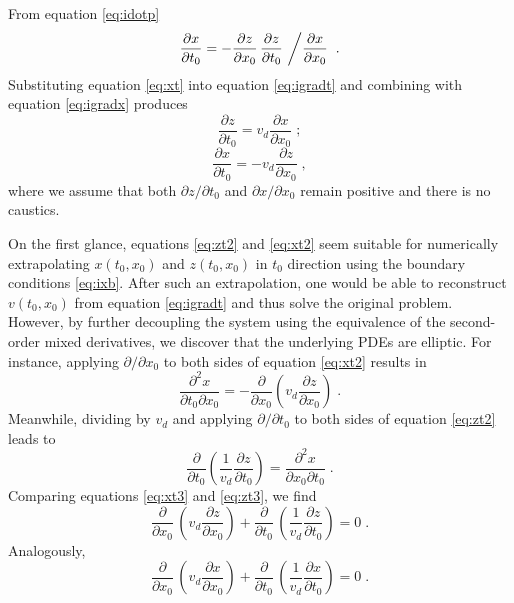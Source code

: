 From equation \ref{eq:idotp}
\begin{equation}
\label{eq:xt}
\frac{\partial x}{\partial t_0} = - \frac{\partial z}{\partial x_0}\,\frac{\partial z}{\partial t_0}\,
\left/ \frac{\partial x}{\partial x_0} \right.\;.
\end{equation}
Substituting equation \ref{eq:xt} into equation \ref{eq:igradt} and combining with equation \ref{eq:igradx} 
produces
\begin{equation}
\label{eq:zt2}
\frac{\partial z}{\partial t_0} = v_d \frac{\partial x}{\partial x_0}\;;
\end{equation}
\begin{equation}
\label{eq:xt2}
\frac{\partial x}{\partial t_0} = - v_d \frac{\partial z}{\partial x_0}\;,
\end{equation}
where we assume that both $\partial z/\partial t_0$ and $\partial x/\partial x_0$ remain positive and there is no 
caustics.

On the first glance, equations \ref{eq:zt2} and \ref{eq:xt2} seem suitable for numerically extrapolating 
$x (t_0,x_0)$ and $z (t_0,x_0)$ in $t_0$ direction using the boundary conditions \ref{eq:ixb}. 
After such an extrapolation, one would be able to reconstruct $v (t_0,x_0)$ from equation \ref{eq:igradt} and 
thus solve the original problem. However, by further decoupling the system using the equivalence of the 
second-order mixed derivatives, we discover that the underlying PDEs are elliptic. For instance, applying 
$\partial / \partial x_0$ to both sides of equation \ref{eq:xt2} results in
\begin{equation}
\label{eq:xt3}
\frac{\partial^2 x}{\partial t_0 \partial x_0} =
- \frac{\partial}{\partial x_0} \left(v_d \frac{\partial z}{\partial x_0}\right)\;.
\end{equation}
Meanwhile, dividing by $v_d$ and applying $\partial / \partial t_0$ to both sides of equation \ref{eq:zt2} 
leads to
\begin{equation}
\label{eq:zt3}
\frac{\partial}{\partial t_0} \left(\frac{1}{v_d} \frac{\partial z}{\partial t_0}\right) =
\frac{\partial^2 x}{\partial x_0 \partial t_0}\;.
\end{equation}
Comparing equations \ref{eq:xt3} and \ref{eq:zt3}, we find
\begin{equation}
\label{eq:zpde}
\frac{\partial}{\partial x_0}\,
\left(v_d \frac{\partial z}{\partial x_0}\right)
+ \frac{\partial}{\partial t_0}\,
\left(\frac{1}{v_d} \frac{\partial z}{\partial t_0}\right) = 0\;.
\end{equation}
Analogously,
\begin{equation}
\label{eq:xpde}
\frac{\partial}{\partial x_0}\,
\left(v_d \frac{\partial x}{\partial x_0}\right)
+ \frac{\partial}{\partial t_0}\,
\left(\frac{1}{v_d} \frac{\partial x}{\partial t_0}\right) = 0\;.
\end{equation}

